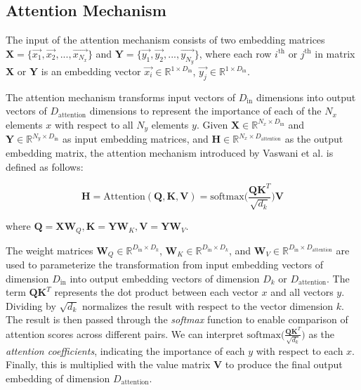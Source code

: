 \subsection{Attention Mechanism}
\label{sec:attentionMechanism}

The input of the attention mechanism consists of two embedding matrices $\mathbf{X} = \Big\{\overrightarrow{x_1}, \overrightarrow{x_2}, ...,  \overrightarrow{x_{N_x}}\Big\}$ and $\mathbf{Y} = \Big\{\overrightarrow{y_1}, \overrightarrow{y_2}, ...,  \overrightarrow{y_{N_y}}\Big\}$, where each row $i^{\text{th}}$ or $j^{\text{th}}$ in matrix $\mathbf{X}$ or $\mathbf{Y}$ is an embedding vector $\overrightarrow{x_i} \in \mathbb{R}^{1 \times D_{\text{in}}}$, $\overrightarrow{y_j} \in \mathbb{R}^{1 \times D_{\text{in}}}$.

The attention mechanism transforms input vectors of $D_{\text{in}}$ dimensions into output vectors of $D_{\text{attention}}$ dimensions to represent the importance of each of the $N_x$ elements $x$ with respect to all $N_y$ elements $y$. Given $\mathbf{X} \in \mathbb{R}^{N_x \times D_\text{in}}$ and $\mathbf{Y} \in \mathbb{R}^{N_y \times D_\text{in}}$ as input embedding matrices, and $\mathbf{H} \in \mathbb{R}^{N_x \times D_\text{attention}}$ as the output embedding matrix, the attention mechanism introduced by Vaswani et al. \cite{vaswani2017attention} is defined as follows:

\begin{equation}
	\label{attention}
	\mathbf{H} = \text{Attention}(\mathbf{Q}, \mathbf{K}, \mathbf{V}) = \text{softmax}\Big(\frac{\mathbf{Q}\mathbf{K}^T}{\sqrt{d_k}}\Big) \mathbf{V}
\end{equation}

where $\mathbf{Q} = \mathbf{X}\mathbf{W}_Q, \mathbf{K} = \mathbf{Y} \mathbf{W}_K, \mathbf{V} = \mathbf{Y} \mathbf{W}_V$.

The weight matrices 
$\mathbf{W}_Q \in \mathbb{R}^{D_{\text{in}} \times D_{k}}$, 
$\mathbf{W}_K \in \mathbb{R}^{D_{\text{in}} \times D_{k}}$, and 
$\mathbf{W}_V \in \mathbb{R}^{D_{\text{in}} \times D_{\text{attention}}}$ 
are used to parameterize the transformation from input embedding vectors of dimension $D_{\text{in}}$ into output embedding vectors of dimension $D_k$ or $D_{\text{attention}}$. The term $\mathbf{Q}\mathbf{K}^T$ represents the dot product between each vector $x$ and all vectors $y$. Dividing by $\sqrt{d_k}$ normalizes the result with respect to the vector dimension $k$. The result is then passed through the \textit{softmax} function to enable comparison of attention scores across different pairs. We can interpret $\text{softmax}\Big(\frac{\mathbf{Q}\mathbf{K}^T}{\sqrt{d_k}}\Big)$ as the \textit{attention coefficients}, indicating the importance of each $y$ with respect to each $x$. Finally, this is multiplied with the value matrix $\mathbf{V}$ to produce the final output embedding of dimension $D_{\text{attention}}$.

